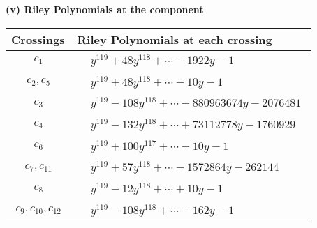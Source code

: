 \documentclass[1p]{elsarticle_modified}
\theoremstyle{definition}
\begin{document}
\newpage\renewcommand{\arraystretch}{1}
\flushleft \textbf{(v) Riley Polynomials at the component}\newline \\
\begin{tabular}{m{50pt}|m{274pt}}
Crossings & \hspace{64pt}Riley Polynomials at each crossing \\
\hline $$\begin{aligned}c_{1}\end{aligned}$$&$\begin{aligned}
&y^{119}+48 y^{118}+\cdots-1922 y-1
\end{aligned}$\\
\hline $$\begin{aligned}c_{2},c_{5}\end{aligned}$$&$\begin{aligned}
&y^{119}+48 y^{118}+\cdots-10 y-1
\end{aligned}$\\
\hline $$\begin{aligned}c_{3}\end{aligned}$$&$\begin{aligned}
&y^{119}-108 y^{118}+\cdots-880963674 y-2076481
\end{aligned}$\\
\hline $$\begin{aligned}c_{4}\end{aligned}$$&$\begin{aligned}
&y^{119}-132 y^{118}+\cdots+73112778 y-1760929
\end{aligned}$\\
\hline $$\begin{aligned}c_{6}\end{aligned}$$&$\begin{aligned}
&y^{119}+100 y^{117}+\cdots-10 y-1
\end{aligned}$\\
\hline $$\begin{aligned}c_{7},c_{11}\end{aligned}$$&$\begin{aligned}
&y^{119}+57 y^{118}+\cdots-1572864 y-262144
\end{aligned}$\\
\hline $$\begin{aligned}c_{8}\end{aligned}$$&$\begin{aligned}
&y^{119}-12 y^{118}+\cdots+10 y-1
\end{aligned}$\\
\hline $$\begin{aligned}c_{9},c_{10},c_{12}\end{aligned}$$&$\begin{aligned}
&y^{119}-108 y^{118}+\cdots-162 y-1
\end{aligned}$\\
\hline
\end{tabular}\\~\\
\end{document}
